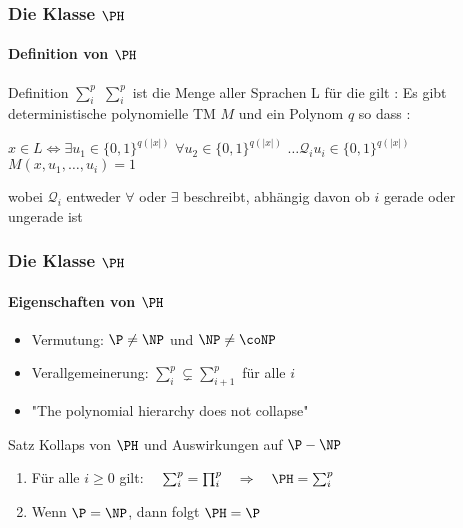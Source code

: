 \begin{frame}
	\frametitle{Die Klasse $\PH$}
	\framesubtitle{Definition von $\PH$}
	
	\begin{KITinfoblock}{Definition	$\sum_{i}^{p} $ }
		$\sum_{i}^{p} $ ist die Menge aller Sprachen L f\"ur die gilt : \newline
		Es gibt deterministische polynomielle TM $M$ und ein Polynom $q$ so dass :
		\newline
		
		$x \in L \Leftrightarrow \exists u_1 \in {\lbrace 0,1 \rbrace }^{q(|x|)}$
		$\forall u_2 \in {\lbrace 0,1 \rbrace }^{q(|x|)}$
		$\ldots \mathcal{Q}_i u_i \in {\lbrace 0,1 \rbrace }^{q(|x|)}$
		$M(x,u_1 ,\ldots , u_i) = 1$	\newline
		
		wobei $\mathcal{Q}_i$ entweder $\forall$ oder $\exists$ beschreibt,
		abh\"angig davon ob $i$ gerade oder ungerade ist
	\end{KITinfoblock}
	\pause
	\bigskip
\end{frame}
\begin{frame} 
	\frametitle{Die Klasse $\PH$}
	\framesubtitle{Eigenschaften von $\PH$}
	
	\begin{itemize}[<+->]
		\item Vermutung: $\P \neq \NP$ und $\NP \neq \coNP$	
		\item Verallgemeinerung:    $\sum_{i}^{p}  \subsetneq \sum_{i+1}^{p}$ für alle $i$
		\item "The polynomial hierarchy does not collapse"
	\end{itemize}
	\bigskip
	\pause
	\begin{KITinfoblock}{Satz Kollaps von $\PH$ und Auswirkungen auf $\P-\NP$}
		\begin{enumerate}[<+->]
			\item Für alle $ i \geq 0$ gilt: $ \quad \sum_{i}^{p} = \prod_{i}^{p} \quad \Rightarrow \quad \PH = \sum_{i}^{p}$
			\item Wenn $\P = \NP$, dann folgt $\PH = \P$
		\end{enumerate}
	\end{KITinfoblock}
\end{frame}
